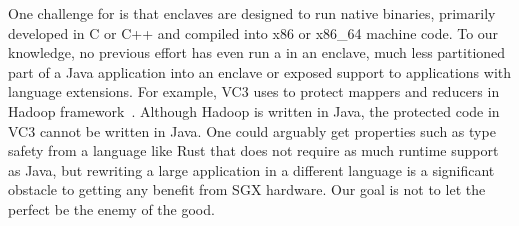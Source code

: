 One challenge for \java{}
is that 
\sgx{} enclaves are designed to run native binaries, primarily developed in C or C++ and compiled into x86 or x86\_64 machine code.
To our knowledge, no previous effort has even run a \jvm{} in an enclave, much less partitioned part of a Java application into an enclave
or exposed \sgx{} support to \java{} applications with language extensions.
For example, VC3 uses \sgx{} to protect mappers and reducers in Hadoop framework~\cite{vc3}.
Although Hadoop is written in Java, the protected code in VC3 cannot be written in Java.
One could arguably get properties such as type safety from a language like Rust that does not require as much runtime support as Java,
but rewriting a large application in a different language is a significant obstacle to getting any benefit from SGX hardware.
Our goal is not to let the perfect be the enemy of the good.





